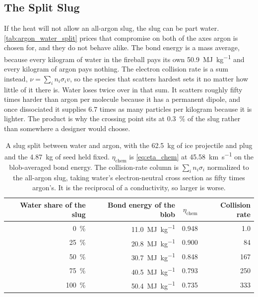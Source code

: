\documentclass{article}
\begin{document}
\subsection*{The Split Slug}
If the heat will not allow an all-argon slug, the slug can be part water. \autoref{tab:argon_water_split} prices that compromise on both of the axes argon is chosen for, and they do not behave alike. The bond energy is a mass average, because every kilogram of water in the fireball pays its own \SI{50.9}{\mega\joule\per\kilogram} and every kilogram of argon pays nothing. The electron collision rate is a sum instead, $\nu = \sum_i n_i \sigma_i v$, so the species that scatters hardest sets it no matter how little of it there is. Water loses twice over in that sum. It scatters roughly fifty times harder than argon per molecule because it has a permanent dipole, and once dissociated it supplies \num{6.7} times as many particles per kilogram because it is lighter. The product is why the crossing point sits at \SI{0.3}{\percent} of the slug rather than somewhere a designer would choose.

\begin{table}[!htpb]
    \centering
    \caption{A slug split between water and argon, with the \SI{62.5}{\kilogram} of ice projectile and plug and the \SI{4.87}{\kilogram} of seed held fixed. $\eta_{\mathrm{chem}}$ is \autoref{eq:eta_chem} at \SI{45.58}{\kilo\meter\per\second} on the blob-averaged bond energy. The collision-rate column is $\sum_i n_i \sigma_i$ normalized to the all-argon slug, taking water's electron-neutral cross section as fifty times argon's. It is the reciprocal of a conductivity, so larger is worse.}
    \label{tab:argon_water_split}
    \begin{tabular}{|r|r|r|r|}\hline
        \textbf{Water share of the slug} & \textbf{Bond energy of the blob} & \textbf{$\eta_{\mathrm{chem}}$} & \textbf{Collision rate} \\\hline
        \SI{0}{\percent} & \SI{11.0}{\mega\joule\per\kilogram} & \num{0.948} & \num{1.0} \\\hline
        \SI{25}{\percent} & \SI{20.8}{\mega\joule\per\kilogram} & \num{0.900} & \num{84} \\\hline
        \SI{50}{\percent} & \SI{30.7}{\mega\joule\per\kilogram} & \num{0.848} & \num{167} \\\hline
        \SI{75}{\percent} & \SI{40.5}{\mega\joule\per\kilogram} & \num{0.793} & \num{250} \\\hline
        \SI{100}{\percent} & \SI{50.4}{\mega\joule\per\kilogram} & \num{0.735} & \num{333} \\\hline
    \end{tabular}
\end{table}
\end{document}
